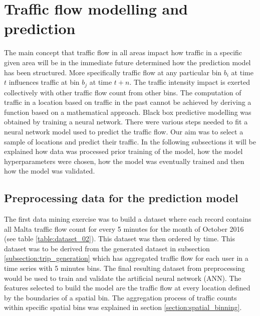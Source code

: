 \documentclass[12pt, a4paper]{report}
\theoremstyle{definition}
\theoremstyle{definition}%
\theoremstyle{definition}%
\theoremstyle{definition}%
\theoremstyle{definition}%
\theoremstyle{definition}%
\begin{document}
\section{Traffic flow modelling and prediction}


The main concept that traffic flow in all areas impact how traffic in a specific given area will be in the immediate future determined how the prediction model has been structured. More specifically traffic flow at any particular bin $b_i$ at time $t$ influences traffic at bin $b_j$ at time $t + n$. The traffic intensity impact is exerted collectively with other traffic flow count from other bins. The computation of traffic in a location based on traffic in the past cannot be achieved by deriving a function based on a mathematical approach. Black box predictive modelling was obtained by training a neural network. There were various steps needed to fit a neural network model used to predict the traffic flow. Our aim was to select a sample of locations and predict their traffic. In the following subsections it will be explained how data was processed prior training of the model, how the model hyperparameters were chosen, how the model was eventually trained and then how the model was validated.



\subsection{Preprocessing data for the prediction model} \label{subsection:Preprocessing data for the prediction model}
The first data mining exercise was to build a dataset where each record contains all Malta traffic flow count for every 5 minutes for the month of October 2016 (see table \ref{table:dataset_02}). This dataset was then ordered by time. This dataset was to be derived from the generated dataset in subsection \ref{subsection:trip_generation} which has aggregated traffic flow for each user in a time series with 5 minutes bins. The final resulting dataset from preprocessing would be used to train and validate the artificial neural network (ANN). The features selected to build the model are the traffic flow at every location defined by the boundaries of a spatial bin. The aggregation process of traffic counts within specific spatial bins was explained in section \ref{section:spatial_binning}.
\end{document}
